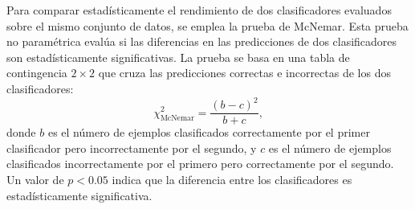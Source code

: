 Para comparar estadísticamente el rendimiento de dos clasificadores evaluados sobre el mismo conjunto de datos, se emplea la prueba de McNemar. Esta prueba no paramétrica evalúa si las diferencias en las predicciones de dos clasificadores son estadísticamente significativas. La prueba se basa en una tabla de contingencia $2 \times 2$ que cruza las predicciones correctas e incorrectas de los dos clasificadores:
\begin{equation}
\chi^2_{\text{McNemar}} = \frac{(b - c)^2}{b + c},
\end{equation}
donde $b$ es el número de ejemplos clasificados correctamente por el primer clasificador pero incorrectamente por el segundo, y $c$ es el número de ejemplos clasificados incorrectamente por el primero pero correctamente por el segundo. Un valor de $p < 0.05$ indica que la diferencia entre los clasificadores es estadísticamente significativa.
